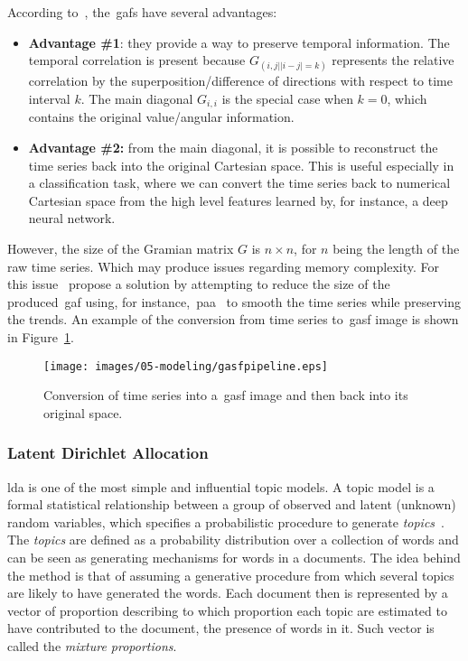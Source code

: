 According to~\cite{wang_imaging_2015}, the~\gls{gaf}s have several advantages:

\begin{itemize}[leftmargin=*,labelsep=5.8mm]
\item \textbf{{Advantage \#1}}: they provide a way to preserve temporal information. The temporal correlation is present because $G_{(i,j||i-j|=k)}$ represents the relative correlation by the superposition/difference of directions with respect to time interval $k$. The main diagonal $G_{i,i}$ is the special case when $k = 0$, which contains the original value/angular information. 
\item \textbf{{Advantage \#2:}} from the main diagonal, it is possible to reconstruct the time series back into the original Cartesian space. This is useful especially in a classification task, where we can convert the time series back to numerical Cartesian space from the high level features learned by, for instance, a deep neural network.
\end{itemize}

However, the size of the Gramian matrix $G$ is $n \times n$, for $n$ being the length of the raw time series. Which may produce issues regarding memory complexity. For this issue~\cite{wang_imaging_2015} propose a solution by attempting to reduce the size of the produced~\gls{gaf} using, for instance,~\gls{paa}~\citep{keogh_scaling_2000} to smooth the time series while preserving the trends. An example of the conversion from time series to~\gls{gasf} image is shown in Figure~\ref{figure:gasf_example}.

\begin{figure} [h]
\centering
\texttt{[image: images/05-modeling/gasfpipeline.eps]} 
 \caption{Conversion of time series into a~\gls{gasf} image and then back into its original space.}
 \label{figure:gasf_example}
\end{figure}

\subsubsection{Latent Dirichlet Allocation}
\glsdesc{lda} is one of the most simple and influential topic models. A topic model is a formal statistical relationship between a group of observed and latent (unknown) random variables, which specifies a probabilistic procedure to generate \textit{topics}~\citep{reed_latent_2012}. The \textit{topics} are defined as a probability distribution over a collection of words and can be seen as generating mechanisms for words in a documents. The idea behind the method is that of assuming a generative procedure from which several topics are likely to have generated the words. Each document then is represented by a vector of proportion describing to which proportion each topic are estimated to have contributed to the document, \ie the presence of words in it. Such vector is called the \textit{mixture proportions}.

